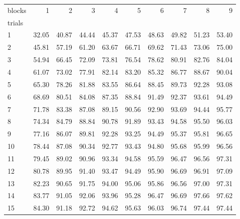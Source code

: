 \begin{tabularx}{\textwidth}{@{}Xrrrrrrrrr@{}}
\toprule
blocks & 1 & 2 & 3 & 4 & 5 & 6 & 7 & 8 & 9 \\
trials &  &  &  &  &  &  &  &  &  \\
\midrule
1 & 32.05 & 40.87 & 44.44 & 45.37 & 47.53 & 48.63 & 49.82 & 51.23 & 53.40 \\
2 & 45.81 & 57.19 & 61.20 & 63.67 & 66.71 & 69.62 & 71.43 & 73.06 & 75.00 \\
3 & 54.94 & 66.45 & 72.09 & 73.81 & 76.54 & 78.62 & 80.91 & 82.76 & 84.04 \\
4 & 61.07 & 73.02 & 77.91 & 82.14 & 83.20 & 85.32 & 86.77 & 88.67 & 90.04 \\
5 & 65.30 & 78.26 & 81.88 & 83.55 & 86.64 & 88.45 & 89.73 & 92.28 & 93.08 \\
6 & 68.69 & 80.51 & 84.08 & 87.35 & 88.84 & 91.49 & 92.37 & 93.61 & 94.49 \\
7 & 71.78 & 83.38 & 87.08 & 89.15 & 90.56 & 92.90 & 93.69 & 94.44 & 95.77 \\
8 & 74.34 & 84.79 & 88.84 & 90.78 & 91.89 & 93.43 & 94.58 & 95.50 & 96.03 \\
9 & 77.16 & 86.07 & 89.81 & 92.28 & 93.25 & 94.49 & 95.37 & 95.81 & 96.65 \\
10 & 78.44 & 87.08 & 90.34 & 92.77 & 93.43 & 94.80 & 95.68 & 95.99 & 96.56 \\
11 & 79.45 & 89.02 & 90.96 & 93.34 & 94.58 & 95.59 & 96.47 & 96.56 & 97.31 \\
12 & 80.78 & 89.95 & 91.40 & 93.47 & 94.49 & 95.90 & 96.69 & 96.91 & 97.09 \\
13 & 82.23 & 90.65 & 91.75 & 94.00 & 95.06 & 95.86 & 96.56 & 97.00 & 97.31 \\
14 & 83.77 & 91.05 & 92.06 & 93.96 & 95.28 & 96.47 & 96.69 & 97.66 & 97.62 \\
15 & 84.30 & 91.18 & 92.72 & 94.62 & 95.63 & 96.03 & 96.74 & 97.44 & 97.44 \\
\bottomrule
\end{tabularx}
